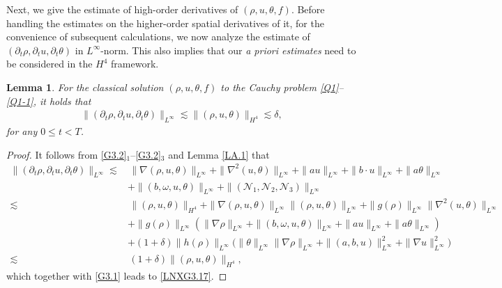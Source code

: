 \documentclass[reqno,11pt]{amsart}
\theoremstyle{plain}
\newtheorem{lem}[thm]{Lemma}
\numberwithin{equation}{section}
\begin{document}
 
Next, we give the   estimate of   high-order  derivatives of     $(\rho, u, \theta, f)$.
Before handling the estimates on the higher-order spatial derivatives of it, for the convenience of subsequent calculations, we now analyze the estimate of $(\partial_t\rho,\partial_t u,\partial_t\theta)$ in  $L^\infty$-norm. This also implies that our {\it a priori estimates} need to be considered in the $H^4$ framework. 
 \begin{lem}\label{LNXL3.2}
For the  classical solution $(\rho, u,\theta,f)$ to the Cauchy problem \eqref{Q1}--\eqref{Q1-1}, it holds that 
\begin{align}\label{LNXG3.17}
\|(\partial_t\rho,\partial_t u,\partial_t\theta)\|_{L^\infty}\lesssim \|(\rho,u,\theta)\|_{H^4}\lesssim \delta,
\end{align}
for any $0 \leq t < T$.
\end{lem}
\begin{proof}
It follows from \eqref{G3.2}$_1$--\eqref{G3.2}$_3$ and Lemma \ref{LA.1} that
\begin{align*}
\|(\partial_t\rho,\partial_t u,\partial_t\theta)\|_{L^\infty}\lesssim&\, \|\nabla (\rho,u,\theta)\|_{L^\infty}+\|\nabla^2(u,\theta)\|_{L^\infty}+\|au\|_{L^\infty}+\|b\cdot u\|_{L^\infty}+\|a\theta\|_{L^\infty}\nonumber\\
&+\|(b,\omega,u,\theta)\|_{L^\infty}+\|(\mathcal{N}_1,\mathcal{N}_2,\mathcal{N}_3)\|_{L^\infty}\nonumber\\
\lesssim&\,  \|(\rho,u,\theta)\|_{H^4}+ \|\nabla(\rho,u,\theta)\|_{L^\infty}\|(\rho,u,\theta)\|_{L^\infty}+\|g
(\rho)\|_{L^\infty}  \|\nabla^2 (u,\theta)\|_{L^\infty} \nonumber\\
&+\|g(\rho)\|_{L^\infty}(\|\nabla\rho\|_{L^\infty}+\|(b,\omega,u,\theta)\|_{L^\infty}+\|au\|_{L^\infty}+\|a\theta\|_{L^\infty})\nonumber\\
&+(1+\delta)\|h(\rho)\|_{L^\infty}\big( \|\theta\|_{L^\infty}\|\nabla\rho\|_{L^\infty}+\|(a,b,u)\|_{L^\infty}^2 +\|\nabla u\|_{L^\infty}^2     \big) \nonumber\\
\lesssim &\,(1+\delta )\|(\rho,u,\theta)\|_{H^4},
\end{align*}
which together with \eqref{G3.1} leads to \eqref{LNXG3.17}.   
\end{proof} 
\end{document}

